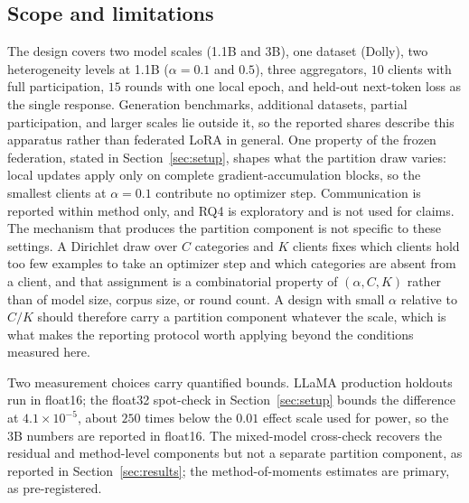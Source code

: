 \subsection{Scope and limitations}
The design covers two model scales (1.1B and 3B), one dataset (Dolly), two heterogeneity
levels at 1.1B ($\alpha{=}0.1$ and $0.5$), three aggregators, $10$ clients with full
participation, $15$ rounds with one local epoch, and held-out next-token loss as the single
response. Generation benchmarks, additional datasets, partial participation, and larger
scales lie outside it, so the reported shares describe this apparatus rather than federated
LoRA in general. One property of the frozen federation, stated in
Section~\ref{sec:setup}, shapes what the partition draw varies: local updates apply only on
complete gradient-accumulation blocks, so the smallest clients at $\alpha{=}0.1$ contribute
no optimizer step. Communication is reported within method only, and RQ4 is exploratory and
is not used for claims.
The mechanism that produces the partition component is not specific to these settings. A
Dirichlet draw over $C$ categories and $K$ clients fixes which clients hold too few
examples to take an optimizer step and which categories are absent from a client, and that
assignment is a combinatorial property of $(\alpha, C, K)$ rather than of model size,
corpus size, or round count. A design with small $\alpha$ relative to $C/K$ should
therefore carry a partition component whatever the scale, which is what makes the reporting
protocol worth applying beyond the conditions measured here.

Two measurement choices carry quantified bounds. LLaMA production holdouts run in float16;
the float32 spot-check in Section~\ref{sec:setup} bounds the difference at
$4.1{\times}10^{-5}$, about $250$ times below the $0.01$ effect scale used for power, so the
3B numbers are reported in float16. The mixed-model cross-check recovers the residual and
method-level components but not a separate partition component, as reported in
Section~\ref{sec:results}; the method-of-moments estimates are primary, as pre-registered.

